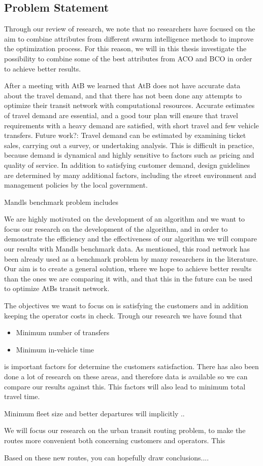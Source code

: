 \subsection{Problem Statement}
Through our review of research, we note that no researchers have focused on the aim to combine attributes from different swarm intelligence methods to improve the optimization process. For this reason, we will in this thesis investigate the possibility to combine some of the best attributes from ACO and BCO in order to achieve better results.

After a meeting with AtB we learned that AtB does not have accurate data about the travel demand, and that there has not been done any attempts to optimize their transit network with computational resources. Accurate estimates of travel demand are essential, and a good tour plan will ensure that travel requirements with a heavy demand are satisfied, with short travel and few vehicle transfers. Future work?: Travel demand can be estimated by examining ticket sales, carrying out a survey, or undertaking analysis. This is difficult in practice, because demand is dynamical and highly sensitive to factors such as pricing and quality of service. In addition to satisfying customer demand, design guidelines are determined by many additional factors, including the street environment and management policies by the local government.

Mandls benchmark problem includes 

We are highly motivated on the development of an algorithm and we want to focus our research on the development of the algorithm, and in order to demonstrate the efficiency and the effectiveness of our algorithm we will compare our results with Mandls benchmark data. As mentioned, this road network has been already used as a benchmark problem by many researchers in the literature. Our aim is to create a general solution, where we hope to achieve better results than the ones we are comparing it with, and that this in the future can be used to optimize AtBs transit network. 


The objectives we want to focus on is satisfying the customers and in addition keeping the operator costs in check. Trough our research we have found that 
\begin{itemize}
\item Minimum number of transfers
\item Minimum in-vehicle time
\end{itemize}
is important factors for determine the customers satisfaction. There has also been done a lot of research on these areas, and therefore data is available so we can compare our results against this. This factors will also lead to minimum total travel time. 

Minimum fleet size and better departures will implicitly ..

We will focus our research on the urban transit routing problem, to make the routes more convenient both concerning customers and operators. This

Based on these new routes, you can hopefully draw conclusions....
